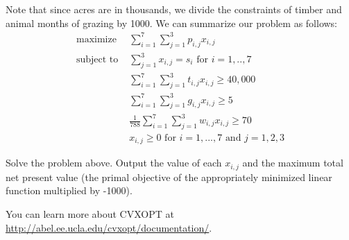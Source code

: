 Note that since acres are in thousands, we divide the constraints of timber and animal months of grazing by 1000. We can summarize our problem as follows:
\begin{align*}
\text{maximize } &\sum\limits_{i=1}^7 \sum\limits_{j=1}^3 p_{i,j}x_{i,j} \\
\text{subject to } &\sum\limits_{j=1}^3 x_{i,j} = s_i  \text{ for } i=1,..,7 \\
	        &\sum\limits_{i=1}^7 \sum\limits_{j=1}^3 t_{i,j}x_{i,j} \geq 40,000 \\
		&\sum\limits_{i=1}^7 \sum\limits_{j=1}^3 g_{i,j}x_{i,j} \geq 5 \\
		&\frac{1}{788} \sum\limits_{i=1}^7 \sum\limits_{j=1}^3 w_{i,j}x_{i,j} \geq 70 \\
		&x_{i,j} \geq 0 \text{ for } i=1,...,7  \text{ and } j=1,2,3
\end{align*}

\begin{problem}
Solve the problem above. Output the value of each $x_{i,j}$ and the maximum total net present value (the primal objective of the appropriately minimized linear function multiplied by -1000).
\end{problem} 

You can learn more about CVXOPT at
\url{http://abel.ee.ucla.edu/cvxopt/documentation/}.
